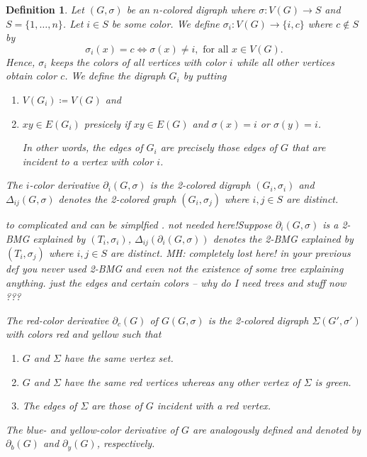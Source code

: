 \documentclass[final,3p,times]{elsarticle}
\newtheorem{definition}{Definition}[section]
\newcommand{\TODO}[1]{\begingroup\color{red}#1\endgroup}
\newcommand{\ak}[1]{\begingroup\color{orange}#1\endgroup}
\newcommand{\OLD}[1]{\begingroup\tiny\color{gray}#1\endgroup}
\newcommand{\mh}[1]{\begingroup\color{blue}#1\endgroup}
\begin{document}
\begin{definition}
\label{def:color-derivative-old}
\mh{Let $(G,\sigma)$ be an $n$-colored digraph where $\sigma\colon V(G) \to S$ 
and $S = \{1,\dots,n\}$. Let $i\in S$ be some color. We define
$\sigma_i\colon V(G) \to \{i,c\}$ where $c\notin S$
by \[\sigma_i(x)=c \iff \sigma(x)\neq i, \text{ for all } x\in V(G).\]
Hence, $\sigma_i$ keeps the colors of all vertices with color $i$ while
all other vertices obtain color $c$. 
We define the digraph $G_i$ by putting
\begin{enumerate}
    \item $V(G_i) \coloneqq V(G)$ and
    
    \item $xy\in E(G_i)$  presicely if $xy\in E(G)$ and 
    	  $\sigma(x)=i	$ or  $\sigma(y)=i$.
    	  
    	  In other words, the edges of $G_i$ are precisely those edges 
    	  of $G$ that are incident to a vertex with color $i$.
\end{enumerate}
%
The \emph{$i$-color derivative} $\partial_i(G,\sigma)$ is the 2-colored
digraph $(G_i,\sigma_i)$ \OLD{and $\Delta_{ij}(G,\sigma)$ denotes the
2-colored graph $(G_i,\sigma_j)$ where $i,j\in S$ are distinct. 
}} 



\OLD{\TODO{to complicated and can be simplfied . not needed here!}\ak{Suppose $\partial_i(G,\sigma)$ is a 2-BMG explained by $(T_i,\sigma_i)$,  $\Delta_{ij}(\partial_i(G,\sigma))$ denotes the
2-BMG explained by $(T_i,\sigma_j)$ where $i,j\in S$ are distinct. 
}
\TODO{MH: completely lost here! in your previous def you never used 2-BMG and even not the existence of some
tree explaining anything.  just the edges and certain colors -- why do I need trees and stuff now ??? }
}





\OLD{
The \emph{red-color derivative} $\partial_c(G)$ of
\OLD{$G$}\mh{$(G,\sigma)$} is the 2-colored digraph
\OLD{$\Sigma$}\mh{$(G',\sigma')$} with colors red and yellow such that
\begin{enumerate}
    \item $G$ and $\Sigma$ have the same vertex set. 
    \item $G$ and $\Sigma$ have the same red vertices whereas any other vertex of $\Sigma$ is green. 
    \item The edges of $\Sigma$ are those of $G$ incident with a red vertex. 
\end{enumerate}
The blue- and yellow-color derivative of $G$ are analogously defined and
denoted by $\partial_b(G)$ and $\partial_y(G)$, respectively. }
\end{definition} 
 
\end{document}
